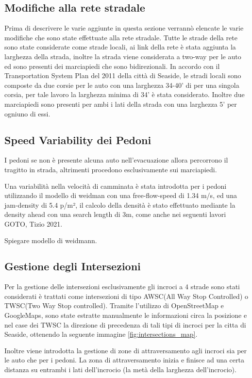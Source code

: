 \subsection*{Modifiche alla rete stradale}
Prima di descrivere le varie aggiunte in questa sezione verrannò elencate le varie modifiche che sono state effettuate alla rete stradale.
Tutte le strade della rete sono state considerate come strade locali, ai link della rete è stata aggiunta la larghezza della strada,
inoltre la strada viene considerata a two-way per le auto ed sono presenti dei marciapiedi che sono bidirezionali.
In accordo con il Transportation System Plan del 2011 della città di Seaside, le stradi locali sono composte da due corsie per le auto
con una larghezza 34-40' di per una singola corsia, per tale lavoro la larghezza minima di 34' è stata considerato.
Inoltre due marciapiedi sono presenti per ambi i lati della strada con una larghezza 5' per ogniuno di essi.


\subsection{Speed Variability dei Pedoni}
I pedoni se non è presente alcuna auto nell'evacuazione allora percorrono il tragitto in strada, altrimenti procedono esclusivamente sui marciapiedi.

Una variabilità nella velocità di camminata è stata introdotta per i pedoni utilizzando il modello di weidman con una free-flow-speed di 1.34 m/s,
ed una jam-density di 5.4 p/m², il calcolo della densità è stato effettuato mediante la density ahead con una search length di 3m, come anche nei seguenti lavori GOTO, Tizio 2021.

Spiegare modello di weidmann.

\newpage

\subsection{Gestione degli Intersezioni}
Per la gestione delle intersezioni esclusivamente gli incroci a 4 strade sono stati considerati è trattati come intersezioni di tipo AWSC(All Way Stop Controlled) o TWSC(Two Way Stop controlled).
Tramite l'utilizzo di OpenStreetMap e GoogleMaps, sono state estratte manualmente le informazioni circa la posizione e nel case dei TWSC la direzione
di precedenza di tali tipi di incroci per la citta di Seaside, ottenendo la seguente immagine \ref{fig:intersections_map}.

Inoltre viene introdotta la gestione di zone di attraversamento agli incroci sia per le auto che per i pedoni.
La zona di attraversamento inizia e finisce ad una certa distanza su entrambi i lati dell'incrocio (la metà della larghezza dell'incrocio).

